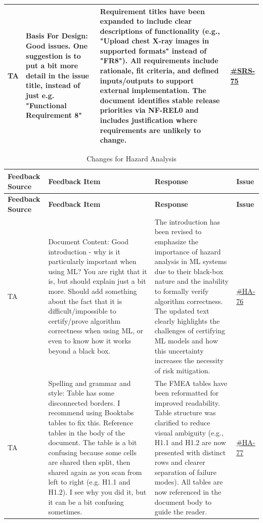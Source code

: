 \documentclass{article}
\begin{document}
\begin{longtable}{|p{1.48cm}|p{5cm}|p{4.7cm}|p{1cm}|}
TA & Basis For Design: Good issues. One suggestion is to put a bit more detail in the issue title, instead of just e.g. "Functional Requirement 8" & Requirement titles have been expanded to include clear descriptions of functionality (e.g., "Upload chest X-ray images in supported formats" instead of "FR8"). All requirements include rationale, fit criteria, and defined inputs/outputs to support external implementation. The document identifies stable release priorities via NF-REL0 and includes justification where requirements are unlikely to change. &\href{https://github.com/harrisonchiu/xray/issues/75}{\#SRS-75} \\
\hline

\end{longtable}

\renewcommand{\arraystretch}{1.3}
\begin{longtable}{|p{1.48cm}|p{5cm}|p{4.7cm}|p{1cm}|}
\caption{Changes for Hazard Analysis} \\
\hline
\textbf{Feedback Source} & \textbf{Feedback Item} & \textbf{Response} & \textbf{Issue} \\
\hline
\endfirsthead

\hline
\textbf{Feedback Source} & \textbf{Feedback Item} & \textbf{Response} & \textbf{Issue} \\
\hline
\endhead

TA & Document Content: Good introduction -  why is it particularly important when using ML? You are right that it is, but should explain just a bit more. Should add something about the fact that it is difficult/impossible to certify/prove algorithm correctness when using ML, or even to know how it works beyond a black box. & The introduction has been revised to emphasize the importance of hazard analysis in ML systems due to their black-box nature and the inability to formally verify algorithm correctness. The updated text clearly highlights the challenges of certifying ML models and how this uncertainty increases the necessity of risk mitigation.
 &\href{https://github.com/harrisonchiu/xray/issues/76}{\#HA-76}\\
\hline

TA & Spelling and grammar and style: Table has some disconnected borders. I recommend using Booktabs tables to fix this. Reference tables in the body of the document. The table is a bit confusing because some cells are shared then split, then shared again as you scan from left to right (e.g. H1.1 and H1.2). I see why you did it, but it can be a bit confusing sometimes. & The FMEA tables have been reformatted for improved readability. Table structure was clarified to reduce visual ambiguity (e.g., H1.1 and H1.2 are now presented with distinct rows and clearer separation of failure modes). All tables are now referenced in the document body to guide the reader.
 &\href{https://github.com/harrisonchiu/xray/issues/77}{\#HA-77}\\
\hline


\end{longtable}
\end{document}
